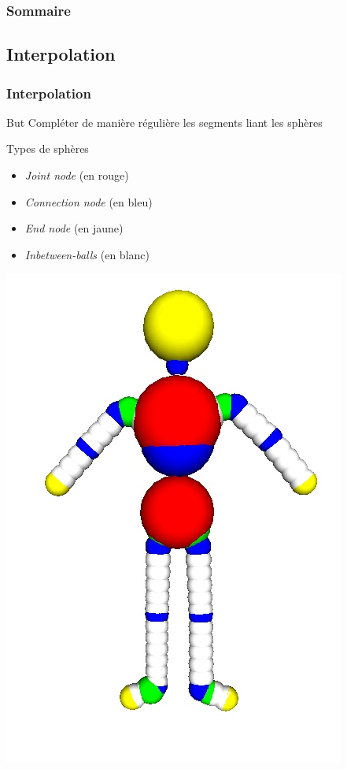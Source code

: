 \documentclass[9pt]{beamer}
\begin{document}
\begin{frame}
	\frametitle{Sommaire}
	\tableofcontents[currentsection]
\end{frame}


\subsection{Interpolation}
\begin{frame}
	\frametitle{Interpolation}
	\begin{block}{But}
		Compléter de manière régulière les segments liant les sphères
	\end{block}
	\begin{block} {Types de sphères}
		\begin{itemize}
			\item \textit{Joint node} (en rouge)
			\item \textit{Connection node} (en bleu)
			\item \textit{End node} (en jaune)
			\item \textit{Inbetween-balls} (en blanc)
		\end{itemize}
	\end{block}
	\begin{center}
	\includegraphics[scale=0.27]{images/bonhomme_interpole.png}
	\end{center}
\end{frame}
\end{document}
